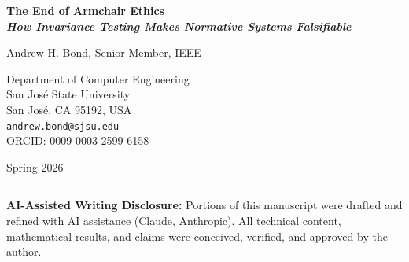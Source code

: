\documentclass[12pt]{article}
\begin{document}
\begin{titlepage}
\centering
\vspace*{2cm}

{\LARGE\bfseries The End of Armchair Ethics\\[0.5em]
\large\textit{How Invariance Testing Makes Normative Systems Falsifiable}}

\vspace{1.5cm}

{\Large Andrew H. Bond, Senior Member, IEEE}

\vspace{0.5cm}

{\large
Department of Computer Engineering\\
San Jos\'e State University\\
San Jos\'e, CA 95192, USA\\[0.3cm]
\texttt{andrew.bond@sjsu.edu}\\[0.3cm]
ORCID: 0009-0003-2599-6158
}

\vspace{1cm}

{\large Spring 2026}

\vspace{2cm}

\begin{abstract}
For twenty-five centuries, ethical claims have been unfalsifiable. You cannot run an
experiment to determine whether utilitarianism is correct. No observation settles
whether Kant was right. This paper argues that the question was malformed. The
answerable question is not whether an ethical theory is true, but whether an ethical
judgment system is consistent, non-gameable, and accountable. These are empirical
properties with pass/fail criteria. We present a framework---Philosophy
Engineering---that provides the first falsifiability conditions for normative systems:
declared invariances, operational tests, minimal witnesses for failures, and machine-checkable
audit artifacts. The result is not a new ethical theory. It is the
infrastructure that makes ethical engineering subject to the same discipline as any
other engineering domain.
\end{abstract}

\vfill

\noindent\rule{\linewidth}{0.4pt}
\small
\noindent\textbf{AI-Assisted Writing Disclosure:} Portions of this manuscript were drafted and refined with AI assistance (Claude, Anthropic). All technical content, mathematical results, and claims were conceived, verified, and approved by the author.


\end{titlepage}
\end{document}
